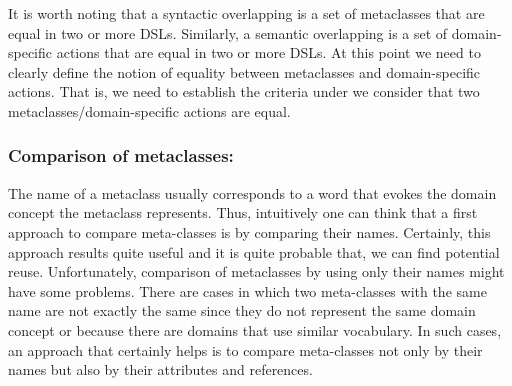 



It is worth noting that a syntactic overlapping is a set of metaclasses that are equal in two or more DSLs. Similarly, a semantic overlapping is a set of domain-specific actions that are equal in two or more DSLs. At this point we need to clearly define the notion of equality between metaclasses and domain-specific actions. That is, we need to establish the criteria under we consider that two metaclasses/domain-specific actions are equal.


\vspace{-3mm}
\subsubsection{Comparison of metaclasses:} The name of a metaclass usually corresponds to a word that evokes the domain concept the metaclass represents. Thus, intuitively one can think that a first approach to compare meta-classes is by comparing their names. Certainly, this approach results quite useful and it is quite probable that, we can find potential reuse.
Unfortunately, comparison of metaclasses by using only their names might have some problems. There are cases in which two meta-classes with the same name are not exactly the same since they do not represent the same domain concept or because there are domains that use similar vocabulary. In such cases, an approach that certainly helps is to compare meta-classes not only by their names but also by their attributes and references.

